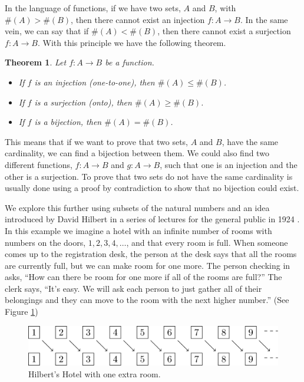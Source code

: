 \documentclass[
]{book}
\newtheorem{theorem}{Theorem}[chapter]
\theoremstyle{definition}
\theoremstyle{definition}
\theoremstyle{definition}
\theoremstyle{definition}
\theoremstyle{remark}
\begin{document}
In the language of functions, if we have two sets, \(A\) and \(B\), with \(\#(A)>\#(B)\), then there cannot exist an injection \(f:A\rightarrow B\). In the same vein, we can say that if \(\#(A) < \#(B)\), then there cannot exist a surjection \(f:A\rightarrow B\). With this principle we have the following theorem.

\begin{theorem}

Let \(f:A\rightarrow B\) be a function.

\begin{itemize}
\item
  If \(f\) is an injection (one-to-one), then \(\#(A)\leq \#(B)\).
\item
  If \(f\) is a surjection (onto), then \(\#(A)\geq \#(B)\).
\item
  If \(f\) is a bijection, then \(\#(A) = \#(B)\).
\end{itemize}

\end{theorem}

This means that if we want to prove that two sets, \(A\) and \(B\), have the same cardinality, we can find a bijection between them. We could also find two different functions, \(f:A\rightarrow B\) and \(g:A\rightarrow B\), such that one is an injection and the other is a surjection. To prove that two sets do not have the same cardinality is usually done using a proof by contradiction to show that no bijection could exist.

We explore this further using subsets of the natural numbers and an idea introduced by David Hilbert in a series of lectures for the general public in 1924 \citep{Hilbert}. In this example we imagine a hotel with an infinite number of rooms with numbers on the doors, \(1, 2, 3, 4, \ldots\), and that every room is full. When someone comes up to the registration desk, the person at the desk says that all the rooms are currently full, but we can make room for one more. The person checking in asks, ``How can there be room for one more if all of the rooms are full?'' The clerk says, ``It's easy. We will ask each person to just gather all of their belongings and they can move to the room with the next higher number.'' (See Figure \ref{fig:hilbert1})

\begin{figure}

{\centering \includegraphics[width=1\linewidth]{tikz/Hilbert-Hotel} 

}

\caption{Hilbert's Hotel with one extra room.}\label{fig:hilbert1}
\end{figure}
\end{document}
